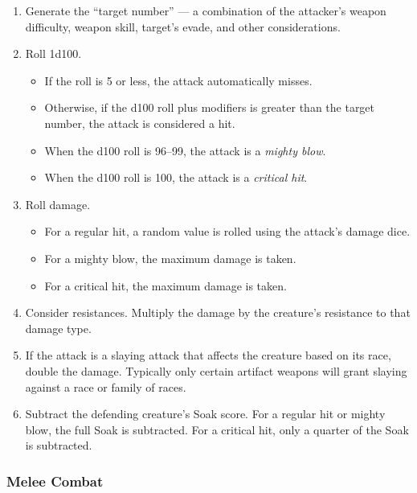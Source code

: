 \begin{enumerate}
\item Generate the ``target number'' --- a combination of the attacker's
weapon difficulty, weapon skill, target's evade, and other considerations.

\item Roll 1d100.
  \begin{itemize}
  \item If the roll is 5 or less, the attack automatically misses.

  \item Otherwise, if the d100 roll plus modifiers is greater than the 
  target number, the attack is considered a hit.  

  \item When the d100 roll is 96--99, the attack is a {\it mighty blow}.

  \item When the d100 roll is 100, the attack is a {\it critical hit}.
  \end{itemize}
\item Roll damage.
  \begin{itemize}
  \item For a regular hit, a random value is rolled using the attack's
  damage dice.

  \item For a mighty blow, the maximum damage is taken.

  \item For a critical hit, the maximum damage is taken.
  \end{itemize}

\item Consider resistances.  Multiply the damage by the creature's
resistance to that damage type.

\item If the attack is a slaying attack that affects the creature based on
its race, double the damage.  Typically only certain artifact weapons will
grant slaying against a race or family of races.

\item Subtract the defending creature's Soak score.  For a regular hit
or mighty blow, the full Soak is subtracted.  For a critical hit, only a
quarter of the Soak is subtracted.
\end{enumerate}

\subsubsection{Melee Combat}

